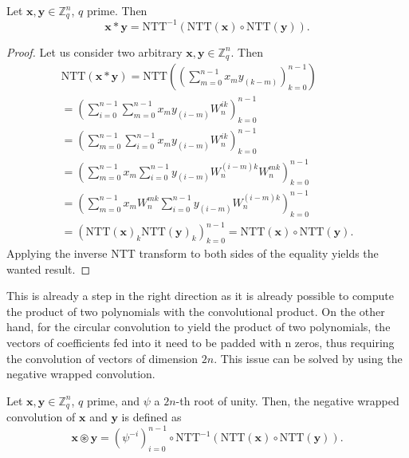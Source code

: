 \begin{theorem}
Let $\mathbf{x},\mathbf{y}\in\mathbb{Z}_q^n$, $q$ prime. Then
\begin{equation*}
\mathbf{x}\ast\mathbf{y} = \mathrm{NTT}^{-1}(\mathrm{NTT}(\mathbf{x}) \circ \mathrm{NTT}(\mathbf{y})).
\end{equation*}
\end{theorem}
\begin{proof}
Let us consider two arbitrary $\mathbf{x},\mathbf{y}\in\mathbb{Z}_q^n$. Then
\begin{equation*}
\begin{aligned}
\mathrm{NTT}(\mathbf{x}\ast\mathbf{y}) = \mathrm{NTT}\left(\left(\sum_{m=0}^{n-1}x_{m}y_{(k-m)}\right)_{k=0}^{n-1}\right)\\
= \left(\sum_{i=0}^{n-1}\sum_{m=0}^{n-1}x_my_{(i-m)}W_n^{ik}\right)_{k=0}^{n-1}\\
= \left(\sum_{m=0}^{n-1}\sum_{i=0}^{n-1}x_my_{(i-m)}W_n^{ik}\right)_{k=0}^{n-1}\\
= \left(\sum_{m=0}^{n-1}x_m\sum_{i=0}^{n-1}y_{(i-m)}W_n^{(i-m)k}W_n^{mk}\right)_{k=0}^{n-1}\\
= \left(\sum_{m=0}^{n-1}x_mW_n^{mk}\sum_{i=0}^{n-1}y_{(i-m)}W_n^{(i-m)k}\right)_{k=0}^{n-1}\\
= \left(\mathrm{NTT}(\mathbf{x})_k\mathrm{NTT}(\mathbf{y})_k\right)_{k=0}^{n-1} = \mathrm{NTT}(\mathbf{x})\circ \mathrm{NTT}(\mathbf{y}).
\end{aligned}
\end{equation*}
Applying the inverse NTT transform to both sides of the equality yields the wanted result.
\end{proof}

This is already a step in the right direction as it is already possible to compute the product of two polynomials with the convolutional product. On the other hand, for the circular convolution to yield the product of two polynomials, the vectors of coefficients fed into it need to be padded with n zeros, thus requiring the convolution of vectors of dimension $2n$. This issue can be solved by using the negative wrapped convolution.

\begin{definition}
Let $\mathbf{x},\mathbf{y}\in\mathbb{Z}_q^n$, $q$ prime, and $\psi$ a $2n$-th root of unity. Then, the negative wrapped convolution of $\mathbf{x}$ and $\mathbf{y}$ is defined as
\begin{equation*}
\mathbf{x}\circledast\mathbf{y} = (\psi^{-i})_{i=0}^{n-1}\circ \mathrm{NTT}^{-1}(\mathrm{NTT}(\mathbf{x})\circ \mathrm{NTT}(\mathbf{y})).
\end{equation*}
\end{definition}

